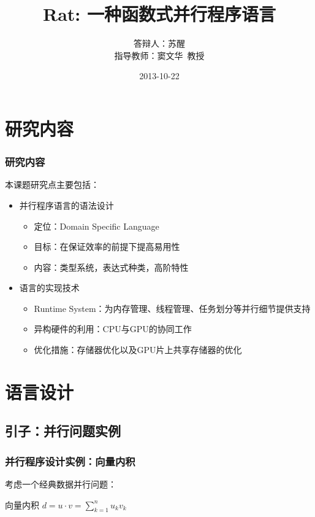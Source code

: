 \documentclass{beamer}
\title{Rat: 一种函数式并行程序语言}
\author[苏醒~pysuxing@gmail.com]{
\begin{tabular}{ll}
答辩人： & 苏醒 \\
指导教师： & 窦文华~教授
\end{tabular}
}
\institute{计算机所641教研室}
\date{2013-10-22}
\begin{document}
\setlength{\parindent}{0pt}
\begin{frame}
  \titlepage
\end{frame}

\begin{frame}
  \tableofcontents
\end{frame}

\section{研究内容}
\frame{\tableofcontents[currentsection]}
\begin{frame}
  \frametitle{研究内容}
  本课题研究点主要包括：
  \begin{itemize}
    \item 并行程序语言的语法设计
      \begin{itemize}
        \item 定位：Domain Specific Language
        \item 目标：在保证效率的前提下提高易用性
        \item 内容：类型系统，表达式种类，高阶特性
      \end{itemize}
      \pause
    \item 语言的实现技术
      \begin{itemize}
        \item Runtime System：为内存管理、线程管理、任务划分等并行细节提供支持
        \item 异构硬件的利用：CPU与GPU的协同工作
        \item 优化措施：存储器优化以及GPU片上共享存储器的优化
      \end{itemize}
  \end{itemize}
\end{frame}

\section{语言设计}
\frame{\tableofcontents[currentsection]}
\subsection{引子：并行问题实例}
\begin{frame}[t]
  \frametitle{并行程序设计实例：向量内积}
  考虑一个经典数据并行问题：
  \begin{block}{向量内积}
    $d=u \cdot v = \sum_{k=1}^nu_kv_k$
  \end{block}

\end{frame}
\end{document}
